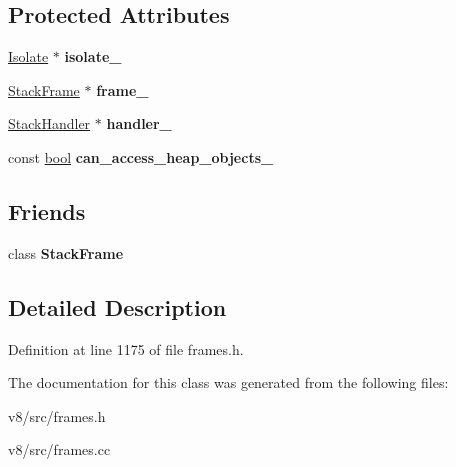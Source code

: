 \subsection*{Protected Attributes}
\begin{DoxyCompactItemize}
\item 
\mbox{\label{classv8_1_1internal_1_1StackFrameIteratorBase_a38dc767b6719ae6fcfe689414c43ecea}} 
\mbox{\hyperlink{classv8_1_1internal_1_1Isolate}{Isolate}} $\ast$ {\bfseries isolate\+\_\+}
\item 
\mbox{\label{classv8_1_1internal_1_1StackFrameIteratorBase_ada022054d9fcb352e7aa086a08d9d2fc}} 
\mbox{\hyperlink{classv8_1_1internal_1_1StackFrame}{Stack\+Frame}} $\ast$ {\bfseries frame\+\_\+}
\item 
\mbox{\label{classv8_1_1internal_1_1StackFrameIteratorBase_a1e196ad2a8f876f33fe99e9a6c649c32}} 
\mbox{\hyperlink{classv8_1_1internal_1_1StackHandler}{Stack\+Handler}} $\ast$ {\bfseries handler\+\_\+}
\item 
\mbox{\label{classv8_1_1internal_1_1StackFrameIteratorBase_a3c090ab533b25a436a50b411a430efc1}} 
const \mbox{\hyperlink{classbool}{bool}} {\bfseries can\+\_\+access\+\_\+heap\+\_\+objects\+\_\+}
\end{DoxyCompactItemize}
\subsection*{Friends}
\begin{DoxyCompactItemize}
\item 
\mbox{\label{classv8_1_1internal_1_1StackFrameIteratorBase_a97d8ed08ddcf9dcc973f7e29b74a992f}} 
class {\bfseries Stack\+Frame}
\end{DoxyCompactItemize}


\subsection{Detailed Description}


Definition at line 1175 of file frames.\+h.



The documentation for this class was generated from the following files\+:\begin{DoxyCompactItemize}
\item 
v8/src/frames.\+h\item 
v8/src/frames.\+cc\end{DoxyCompactItemize}
